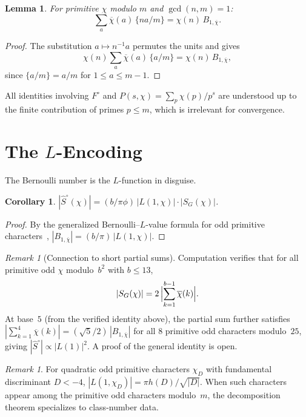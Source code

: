 \documentclass[12pt]{amsart}
\newtheorem{lemma}[theorem]{Lemma}
\newtheorem{corollary}[theorem]{Corollary}
\theoremstyle{definition}
\theoremstyle{remark}
\newtheorem{remark}[theorem]{Remark}
\begin{document}
\begin{lemma}\label{lem:bernoulli}
For primitive $\chi$ modulo $m$ and $\gcd(n,m)=1$:
\[
\sum_a \overline{\chi}(a)\, \{na/m\}
= \chi(n)\, B_{1,\overline{\chi}}.
\]
\end{lemma}

\begin{proof}
The substitution $a \mapsto n^{-1}a$ permutes the
units and gives
\[
\chi(n) \sum_a \overline{\chi}(a)\, \{a/m\}
= \chi(n)\, B_{1,\overline{\chi}},
\]
since $\{a/m\} = a/m$ for $1 \le a \le m{-}1$.
\end{proof}

All identities involving $F^{\circ}$ and
$P(s, \chi) = \sum_p \chi(p)/p^s$ are understood up
to the finite contribution of primes $p \le m$,
which is irrelevant for convergence.

\section{The $L$-Encoding}

The Bernoulli number is the $L$-function in disguise.

\begin{corollary}\label{cor:encoding}
$|\hat{S}^{\circ}(\chi)|
= (b / \pi\phi)\, |L(1, \chi)| \cdot |S_G(\chi)|$.
\end{corollary}

\begin{proof}
By the generalized Bernoulli--$L$-value formula
for odd primitive characters~\cite{davenport},
$|B_{1,\overline{\chi}}| = (b/\pi)\, |L(1, \chi)|$.
\end{proof}

\begin{remark}[Connection to short partial sums]
Computation verifies that for all primitive odd
$\chi$ modulo~$b^2$ with $b \le 13$,
\[
|S_G(\chi)| = 2\,\Bigl|\sum_{k=1}^{b-1}
\overline{\chi}(k)\Bigr|.
\]
At base~$5$ (from the verified identity above),
the partial sum further satisfies
$|\sum_{k=1}^{4} \overline{\chi}(k)|
= (\sqrt{5}/2)\, |B_{1,\overline{\chi}}|$ for
all $8$ primitive odd characters modulo~$25$,
giving $|\hat{S}^{\circ}| \propto |L(1)|^2$.
A proof of the general identity is open.
\end{remark}

\begin{remark}
For quadratic odd primitive characters $\chi_D$ with
fundamental discriminant $D < -4$,
$|L(1, \chi_D)| = \pi h(D) / \sqrt{|D|}$.
When such characters appear among the primitive odd
characters modulo~$m$, the decomposition theorem
specializes to class-number data.
\end{remark}
\end{document}
